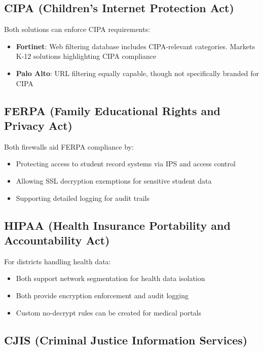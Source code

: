 \documentclass[12pt]{article}
\begin{document}
\subsection{CIPA (Children's Internet Protection Act)}

Both solutions can enforce CIPA requirements:
\begin{itemize}
    \item \textbf{Fortinet}: Web filtering database includes CIPA-relevant categories. Markets K-12 solutions highlighting CIPA compliance \cite{fortinetk12} \cite{fortinetcipawhitepaper}
    \item \textbf{Palo Alto}: URL filtering equally capable, though not specifically branded for CIPA
\end{itemize}

\subsection{FERPA (Family Educational Rights and Privacy Act)}

Both firewalls aid FERPA compliance by:
\begin{itemize}
    \item Protecting access to student record systems via IPS and access control
    \item Allowing SSL decryption exemptions for sensitive student data
    \item Supporting detailed logging for audit trails
\end{itemize}

\subsection{HIPAA (Health Insurance Portability and Accountability Act)}

For districts handling health data:
\begin{itemize}
    \item Both support network segmentation for health data isolation
    \item Both provide encryption enforcement and audit logging
    \item Custom no-decrypt rules can be created for medical portals
\end{itemize}

\subsection{CJIS (Criminal Justice Information Services)}
\end{document}
